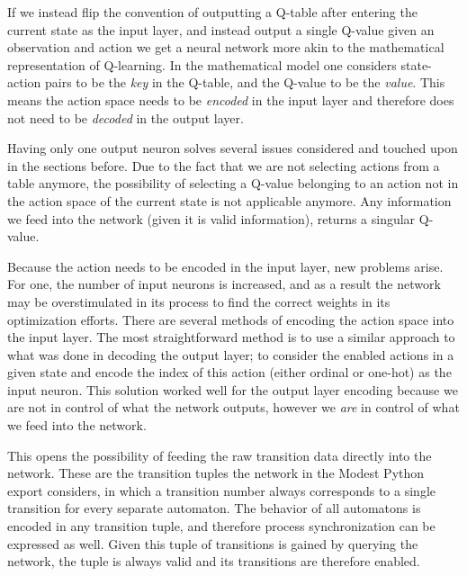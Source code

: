 If we instead flip the convention of outputting a Q-table after entering the current state as the input layer, and instead output a single Q-value given an observation and action we get a neural network more akin to the mathematical representation of Q-learning. In the mathematical model one considers state-action pairs to be the \emph{key} in the Q-table, and the Q-value to be the \emph{value}. This means the action space needs to be \emph{encoded} in the input layer and therefore does not need to be \emph{decoded} in the output layer.

Having only one output neuron solves several issues considered and touched upon in the sections before. Due to the fact that we are not selecting actions from a table anymore, the possibility of selecting a Q-value belonging to an action not in the action space of the current state is not applicable anymore. Any information we feed into the network (given it is valid information), returns a singular Q-value.

Because the action needs to be encoded in the input layer, new problems arise. For one, the number of input neurons is increased, and as a result the network may be overstimulated in its process to find the correct weights in its optimization efforts. There are several methods of encoding the action space into the input layer. The most straightforward method is to use a similar approach to what was done in decoding the output layer; to consider the enabled actions in a given state and encode the index of this action (either ordinal or one-hot) as the input neuron. This solution worked well for the output layer encoding because we are not in control of what the network outputs, however we \emph{are} in control of what we feed into the network.

This opens the possibility of feeding the raw transition data directly into the network. These are the transition tuples the network in the Modest Python export considers, in which a transition number always corresponds to a single transition for every separate automaton. The behavior of all automatons is encoded in any transition tuple, and therefore process synchronization can be expressed as well. Given this tuple of transitions is gained by querying the network, the tuple is always valid and its transitions are therefore enabled.

